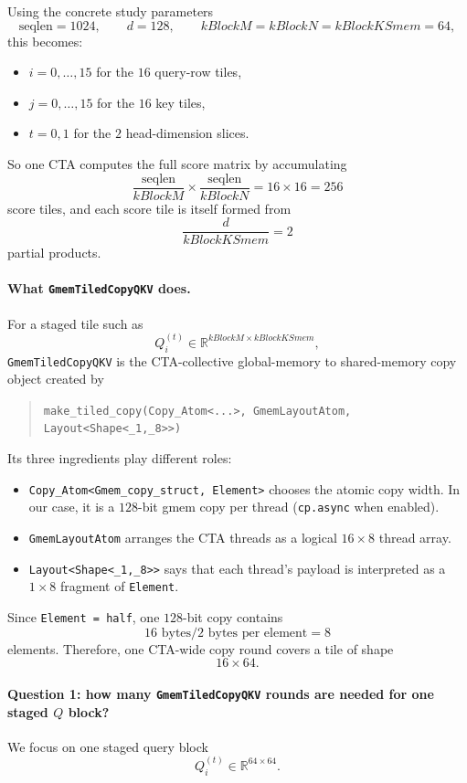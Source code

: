 \documentclass[11pt]{article}
\newcommand{\R}{\mathbb{R}}
\begin{document}
Using the concrete study parameters
\[
\mathrm{seqlen} = 1024, \qquad d = 128, \qquad
kBlockM = kBlockN = kBlockKSmem = 64,
\]
this becomes:
\begin{itemize}
    \item $i = 0, \dots, 15$ for the $16$ query-row tiles,
    \item $j = 0, \dots, 15$ for the $16$ key tiles,
    \item $t = 0, 1$ for the $2$ head-dimension slices.
\end{itemize}

So one CTA computes the full score matrix by accumulating
\[
\frac{\mathrm{seqlen}}{kBlockM}
\times
\frac{\mathrm{seqlen}}{kBlockN}
=
16 \times 16 = 256
\]
score tiles, and each score tile is itself formed from
\[
\frac{d}{kBlockKSmem} = 2
\]
partial products.

\paragraph{What \texttt{GmemTiledCopyQKV} does.}
For a staged tile such as
\[
Q_i^{(t)} \in \R^{kBlockM \times kBlockKSmem},
\]
\texttt{GmemTiledCopyQKV} is the CTA-collective global-memory to shared-memory
copy object created by
\begin{quote}
\texttt{make\_tiled\_copy(Copy\_Atom<...>, GmemLayoutAtom, Layout<Shape<\_1,\_8>>)}
\end{quote}
Its three ingredients play different roles:
\begin{itemize}
    \item \texttt{Copy\_Atom<Gmem\_copy\_struct, Element>} chooses the atomic
    copy width. In our case, it is a $128$-bit gmem copy per thread
    (\texttt{cp.async} when enabled).
    \item \texttt{GmemLayoutAtom} arranges the CTA threads as a logical
    $16 \times 8$ thread array.
    \item \texttt{Layout<Shape<\_1,\_8>>} says that each thread's payload is
    interpreted as a $1 \times 8$ fragment of \texttt{Element}.
\end{itemize}

Since \texttt{Element = half}, one $128$-bit copy contains
\[
16 \text{ bytes} / 2 \text{ bytes per element} = 8
\]
elements. Therefore, one CTA-wide copy round covers a tile of shape
\[
16 \times 64.
\]

\paragraph{Question 1: how many \texttt{GmemTiledCopyQKV} rounds are needed for one staged $Q$ block?}
We focus on one staged query block
\[
Q_i^{(t)} \in \R^{64 \times 64}.
\]
\end{document}
